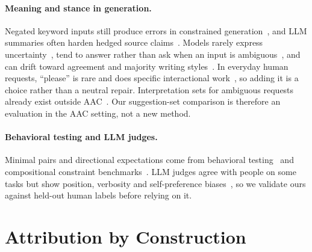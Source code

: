 \documentclass{ceurart}
\newcommand{\say}[1]{``#1''}
\begin{document}
\paragraph{Meaning and stance in generation.}
Negated keyword inputs still produce errors in constrained generation~\cite{varshney-etal-2025-investigating}, and LLM summaries often harden hedged source claims~\cite{baradziej2026hedge}.
Models rarely express uncertainty~\cite{zhou2024relying}, tend to answer rather than ask when an input is ambiguous~\cite{su2026knowing}, and can drift toward agreement and majority writing styles~\cite{sharma2024sycophancy,agarwal2025homogenize}.
In everyday human requests, \say{please} is rare and does specific interactional work~\cite{chalfoun2025please}, so adding it is a choice rather than a neutral repair.
Interpretation sets for ambiguous requests already exist outside AAC~\cite{min-etal-2020-ambigqa,saparina2026reasoningintent}.
Our suggestion-set comparison is therefore an evaluation in the AAC setting, not a new method.

\paragraph{Behavioral testing and LLM judges.}
Minimal pairs and directional expectations come from behavioral testing~\cite{ribeiro2020checklist} and compositional constraint benchmarks~\cite{yao2024collie}.
LLM judges agree with people on some tasks but show position, verbosity and self-preference biases~\cite{zheng2023judging,panickssery2024selfpreference}, so we validate ours against held-out human labels before relying on it.

\section{Attribution by Construction}
\label{sec:framework}
\end{document}
